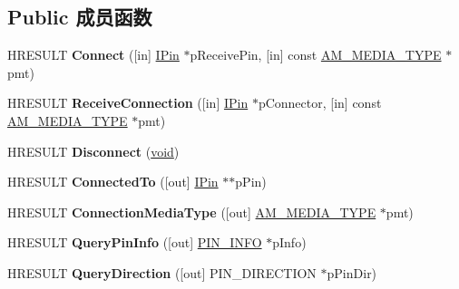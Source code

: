 \subsection*{Public 成员函数}
\begin{DoxyCompactItemize}
\item 
\mbox{\label{interface_i_pin_accf3ec3f3ddf4cacebbafb604e84ed43}} 
H\+R\+E\+S\+U\+LT {\bfseries Connect} (\mbox{[}in\mbox{]} \hyperlink{interface_i_pin}{I\+Pin} $\ast$p\+Receive\+Pin, \mbox{[}in\mbox{]} const \hyperlink{struct_a_m___m_e_d_i_a___t_y_p_e}{A\+M\+\_\+\+M\+E\+D\+I\+A\+\_\+\+T\+Y\+PE} $\ast$pmt)
\item 
\mbox{\label{interface_i_pin_ac8ef3fae652dc10b09b0f35a48971a69}} 
H\+R\+E\+S\+U\+LT {\bfseries Receive\+Connection} (\mbox{[}in\mbox{]} \hyperlink{interface_i_pin}{I\+Pin} $\ast$p\+Connector, \mbox{[}in\mbox{]} const \hyperlink{struct_a_m___m_e_d_i_a___t_y_p_e}{A\+M\+\_\+\+M\+E\+D\+I\+A\+\_\+\+T\+Y\+PE} $\ast$pmt)
\item 
\mbox{\label{interface_i_pin_ac36d6341c16f6ed071ad99032afa05ab}} 
H\+R\+E\+S\+U\+LT {\bfseries Disconnect} (\hyperlink{interfacevoid}{void})
\item 
\mbox{\label{interface_i_pin_a4bcd3cc2b62bb00aac545853ff8462a8}} 
H\+R\+E\+S\+U\+LT {\bfseries Connected\+To} (\mbox{[}out\mbox{]} \hyperlink{interface_i_pin}{I\+Pin} $\ast$$\ast$p\+Pin)
\item 
\mbox{\label{interface_i_pin_a8687874991559690b6d42564402412db}} 
H\+R\+E\+S\+U\+LT {\bfseries Connection\+Media\+Type} (\mbox{[}out\mbox{]} \hyperlink{struct_a_m___m_e_d_i_a___t_y_p_e}{A\+M\+\_\+\+M\+E\+D\+I\+A\+\_\+\+T\+Y\+PE} $\ast$pmt)
\item 
\mbox{\label{interface_i_pin_a277f3dc066f51ce768db1dccf5c702c4}} 
H\+R\+E\+S\+U\+LT {\bfseries Query\+Pin\+Info} (\mbox{[}out\mbox{]} \hyperlink{struct_i_pin_1_1___pin_info}{P\+I\+N\+\_\+\+I\+N\+FO} $\ast$p\+Info)
\item 
\mbox{\label{interface_i_pin_aad86af50fe56e83b451211c9729aeaa3}} 
H\+R\+E\+S\+U\+LT {\bfseries Query\+Direction} (\mbox{[}out\mbox{]} P\+I\+N\+\_\+\+D\+I\+R\+E\+C\+T\+I\+ON $\ast$p\+Pin\+Dir)
$$
\end{DoxyCompactItemize}
